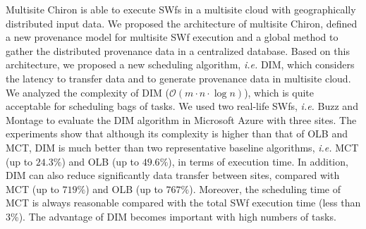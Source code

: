Multisite Chiron is able to execute SWfs in a multisite cloud with geographically distributed input data. We proposed the architecture of multisite Chiron, defined a new provenance model for multisite SWf execution and a global method to gather the distributed provenance data in a centralized database. Based on this architecture, we proposed a new scheduling algorithm, \textit{i.e.} DIM, which considers the latency to transfer data and to generate provenance data in multisite cloud. We analyzed the complexity of DIM ($\mathcal{O}(m\cdot n\cdot \log{}n)$), which is quite acceptable for scheduling bags of tasks. We used two real-life SWfs, \textit{i.e.} Buzz and Montage to evaluate the DIM algorithm in Microsoft Azure with three sites. The experiments show that although its complexity is higher than that of OLB and MCT, DIM is much better than two representative baseline algorithms, \textit{i.e.} MCT (up to $24.3\%$) and OLB (up to $49.6\%$), in terms of execution time. In addition, DIM can also reduce significantly data transfer between sites, compared with MCT (up to $719\%$) and OLB (up to $767\%$). Moreover, the scheduling time of MCT is always reasonable compared with the total SWf execution time (less than $3$\%).  The advantage of DIM becomes important with high numbers of tasks.
